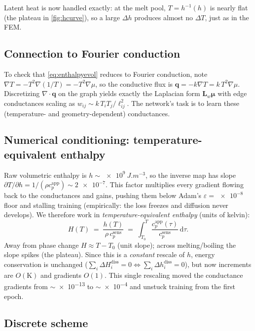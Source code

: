 \documentclass[11pt]{article}
\newcommand{\dd}{\mathrm{d}}
\newcommand{\grad}{\nabla}
\newcommand{\Lw}{\bm{L}_{\!w}}
\newcommand{\bmu}{\bm{\mu}}
\newcommand{\cpapp}{c_p^{\mathrm{app}}}
\newcommand{\cpsens}{c_p^{\mathrm{sens}}}
\theoremstyle{definition}
\begin{document}
Latent heat is now handled exactly: at the melt pool, $T=h^{-1}(h)$ is nearly flat
(the plateau in \cref{fig:hcurve}), so a large $\Delta h$ produces almost no $\Delta T$,
just as in the FEM.

\subsection{Connection to Fourier conduction}

To check that \cref{eq:enthalpyevol} reduces to Fourier conduction, note
$\grad T=-T^2\grad(1/T)=-T^2\grad\mu$, so the conductive flux is
$\bm q=-k\grad T=k\,T^2\grad\mu$. Discretizing $\grad\!\cdot\!\bm q$ on the graph yields
exactly the Laplacian form $\Lw\bmu$ with edge conductances scaling as
$w_{ij}\sim k\,T_iT_j/\ell_{ij}^2$. The network's task is to learn these
(temperature- and geometry-dependent) conductances.

\subsection{Numerical conditioning: temperature-equivalent enthalpy}
\label{sec:conditioning}

Raw volumetric enthalpy is $h\sim\SI{e9}{J.m^{-3}}$, so the inverse map has slope
$\partial T/\partial h=1/(\rho\cpapp)\sim\num{2e-7}$. This factor multiplies every
gradient flowing back to the conductances and gains, pushing them below Adam's
$\varepsilon=\num{e-8}$ floor and stalling training (empirically: the loss freezes and
diffusion never develops). We therefore work in \emph{temperature-equivalent enthalpy}
(units of kelvin):
\begin{equation}
  H(T) \;=\; \frac{h(T)}{\rho\,\cpsens}
  \;=\; \int_{T_0}^{T}\frac{\cpapp(\tau)}{\cpsens}\,\dd\tau .
  \label{eq:Heq}
\end{equation}
Away from phase change $H\approx T-T_0$ (unit slope); across melting/boiling the slope
spikes (the plateau). Since this is a \emph{constant} rescale of $h$, energy conservation
is unchanged ($\sum_i\Delta H_i^{\mathrm{diss}}=0\Leftrightarrow\sum_i\Delta
h_i^{\mathrm{diss}}=0$), but now increments are $O(\mathrm K)$ and gradients $O(1)$.
This single rescaling moved the conductance gradients from $\sim$\num{e-13} to
$\sim$\num{e-4} and unstuck training from the first epoch.

\subsection{Discrete scheme}
\end{document}
